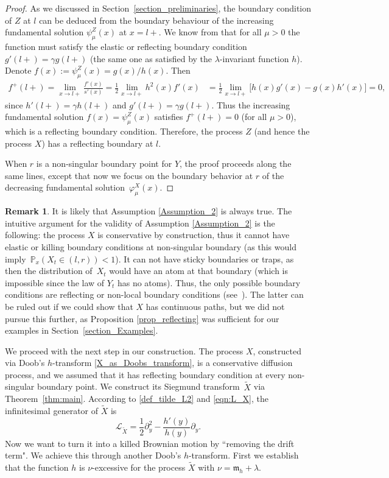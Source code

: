 \documentclass[10pt,a4paper]{amsart}
\numberwithin{equation}{section}
\theoremstyle{definition}
\newtheorem{Remark}[Theorem]{Remark}
\def\L{{\mathcal L}}
\def\p{{\mathbb P}}
\begin{document}
\begin{proof}
As we discussed in Section~\ref{section_preliminaries}, the boundary condition of $Z$ at $l$ can be deduced from the boundary behaviour of the increasing fundamental solution $\psi^Z_{\mu}(x)$ at $x=l+$. We know from \cite[Section II.10]{Borodin2002} that for all $\mu>0$ the function  must satisfy the elastic or reflecting boundary condition $g'(l+)=\gamma g(l+)$ (the same one as satisfied by the $\lambda$-invariant function $h$). Denote $f(x):=\psi^Z_{\mu}(x)=g(x)/h(x)$. Then
\begin{align*}
f^+(l+)=\lim\limits_{x\to l+} \frac{f'(x)}{s'(x)}=
\frac{1}{2} \lim\limits_{x\to l+} h^2(x) f'(x)&=
\frac{1}{2} \lim\limits_{x\to l+} \big[
h(x) g'(x)-
g(x) h'(x)
\big]=0,
\end{align*}
since $h'(l+)=\gamma h(l+)$ and $g'(l+)=\gamma g(l+)$.
Thus the increasing fundamental solution $f(x)=\psi^Z_{\mu}(x)$ satisfies $f^+(l+)=0$ (for all $\mu>0$), which is a reflecting boundary condition. Therefore, the process $Z$ (and hence the process $X$) has a reflecting boundary at $l$.

When $r$ is a non-singular boundary point for $Y$, the proof proceeds along the same lines, except that now we focus on the boundary behavior at $r$ of the decreasing fundamental solution~$\varphi^X_{\mu}(x)$.
\end{proof}


\begin{Remark}
It is likely that Assumption \ref{Assumption_2} is always true. The intuitive argument for the validity of Assumption \ref{Assumption_2} is the following: the process $X$ is conservative by construction, thus it cannot have elastic or killing boundary conditions at non-singular boundary (as this would imply~${\p_x(X_t \in (l,r))<1}$). It can not have sticky boundaries or traps, as then the distribution of~$X_t$ would have an atom at that boundary (which is impossible since the law of $Y_t$ has no atoms). Thus, the only possible boundary conditions are reflecting or non-local boundary conditions (see~\cite[Theorem 2, p.\ 39]{Mandl1968}). The latter can be ruled out if we could show that $X$ has continuous paths, but we did not pursue this further, as Proposition \ref{prop_reflecting} was sufficient for our examples in Section~\ref{section_Examples}.
\end{Remark}

We proceed with the next step in our construction. The process $X$, constructed via Doob's $h$-transform \eqref{X_as_Doobs_transform}, is a conservative diffusion process, and we assumed that it has reflecting boundary condition at every non-singular boundary point. We construct its Siegmund transform~$\widetilde X$ via Theorem~\ref{thm:main}. According to \eqref{def_tilde_L2} and \eqref{eqn:L_X}, the infinitesimal generator of $\widetilde X$ is
\[
\L_{\widetilde X}=\frac{1}{2} \partial_y^2 - \frac{h'(y)}{h(y)} \partial_y.
\]
Now we want to turn it into a killed Brownian motion by ``removing the drift term". We achieve this through another Doob's $h$-transform. First we establish that the function $h$ is $\nu$-excessive for the process $\widetilde X$ with $\nu={\mathfrak m}_h+\lambda$.
\end{document}
